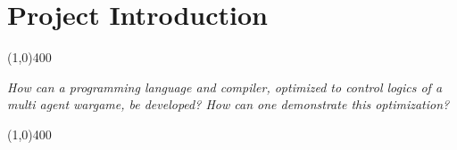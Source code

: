 \chapter{Project Introduction}



\begin{center}
\line(1,0){400}
\end{center}

\textit{How can a programming language and compiler, optimized to control logics of a multi agent wargame, be developed? How can one demonstrate this optimization?}

\begin{center}
\line(1,0){400}
\end{center}